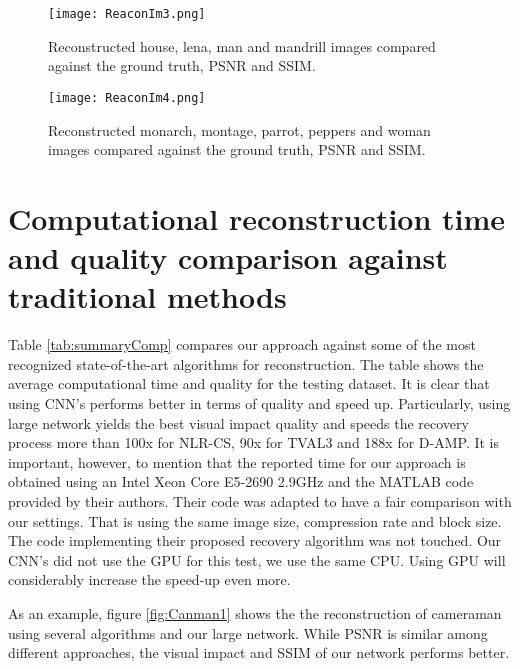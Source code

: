 \begin{figure}[!htb]
\vspace{4.5cm}
\centering 
\texttt{[image: ReaconIm3.png]} 
\caption[Reconstructed testing images subset 3]{Reconstructed house, lena, man and mandrill images compared against the ground truth, PSNR and SSIM.}
\label{fig:Recon3} 
\end{figure} 

\begin{figure}[!htb] 
\vspace{3.5cm}
\centering 
\texttt{[image: ReaconIm4.png]}
\caption[Reconstructed testing images subset 4]{Reconstructed monarch, montage, parrot, peppers and woman images compared against the ground truth, PSNR and SSIM.}
\label{fig:Recon4} 
\end{figure} 


\FloatBarrier
\section{Computational reconstruction time and quality comparison against traditional methods}
Table \ref{tab:summaryComp} compares our approach against some of the most recognized state-of-the-art algorithms for reconstruction. The table shows the average computational time and quality for the testing dataset. It is clear that using CNN's performs better in terms of quality and speed up. Particularly, using large network yields the best visual impact quality and speeds the recovery process more than 100x for NLR-CS, 90x for TVAL3 and 188x for D-AMP. It is important, however, to mention that the reported time for our approach is obtained using an Intel Xeon Core E5-2690 2.9GHz and the MATLAB code provided by their authors. Their code was adapted to have a fair comparison with our settings. That is using the same image size, compression rate and block size. The code implementing their proposed recovery algorithm was not touched. Our CNN's did not use the GPU for this test, we use the same CPU. Using GPU will considerably increase the speed-up even more.   

As an example, figure \ref{fig:Canman1} shows the the reconstruction of cameraman using several algorithms and our large network. While PSNR is similar among different approaches, the visual impact and SSIM of our network performs better.

